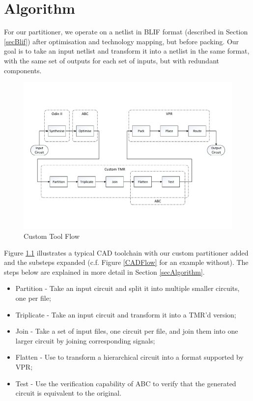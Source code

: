 \documentclass[12pt,final,oneside,a4paper]{dwThesis} %
\begin{document}
   \chapter{Algorithm}\label{algorithm}
   For our partitioner, we operate on a netlist in
   \gls{BLIF} format (described in Section \ref{secBlif}) after optimisation
   and technology mapping, but before packing. Our goal is to take an input
   netlist and transform it into a netlist in the same format, with the same
   set of outputs for each set of inputs, but with redundant components.

   \begin{figure}

      \begin{center}

         \includegraphics[width=\linewidth]{images/CadFlowWPartitioner.pdf}
         \caption{Custom Tool Flow} \label{algToolflow} 
      \end{center}


   \end{figure}
   Figure \ref{algToolflow} illustrates a typical \gls{CAD} toolchain with our
   custom partitioner added and the substeps expanded (c.f. Figure
   \ref{CADFlow} for an example without). The steps below are explained in more
   detail in Section \ref{secAlgorithm}.
   \begin{itemize}

      \item Partition - Take an input circuit and split it into multiple
         smaller circuits, one per file;
      \item Triplicate - Take an input circuit and transform it into a TMR'd
         version;
      \item Join - Take a set of input files, one circuit per file, and join
         them into one larger circuit by joining corresponding signals;
      \item Flatten - Use  to transform a hierarchical circuit into a
         format supported by VPR;
      \item Test - Use the verification capability of \gls{ABC} to verify that
         the generated circuit is equivalent to the original.  
   \end{itemize}
\end{document}
